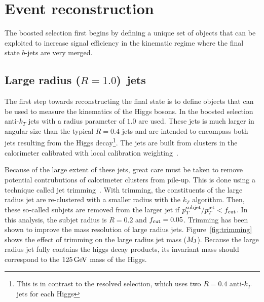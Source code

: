 \section{Event reconstruction}

The boosted selection first begins by defining a unique set of objects that can be exploited to increase signal efficiency in the kinematic regime where the final state $b$-jets are very merged. 

\subsection{Large radius ($R = 1.0$)\, jets}

The first step towards reconstructing the final state is to define objects that can be used to measure the kinematics of the Higgs bosons. In the boosted selection anti-$k_{T}$ jets with a radius parameter of $1.0$ are used. These jets is much larger in angular size than the typical $R=0.4$ jets and are intended to encompass both jets resulting from the Higgs decay\footnote{This is in contrast to the resolved selection, which uses two $R=0.4$ anti-$k_{T}$ jets for each Higgs}. The jets are built from clusters in the calorimeter calibrated with local calibration weighting~\cite{JetCalib}. 

Because of the large extent of these jets, great care must be taken to remove potential contrubutions of calorimeter clusters from pile-up. This is done using a technique called jet trimming~\cite{Trimming}. With trimming, the constituents of the large radius jet are re-clustered with a smaller radius with the $k_{T}$ algorithm. Then, these so-called subjets are removed from the larger jet if $p_{T}^{\rm subjet}/p_{T}^{\rm jet} < f_{\rm cut}$. In this analysis, the subjet radius is $R = 0.2$ and $f_{\rm cut} = 0.05$. Trimming has been shown to improve the mass resolution of large radius jets. Figure~\ref{fig:trimming} shows the effect of trimming on the large radius jet mass ($M_{\rm J}$). Because the large radius jet fully contains the higgs decay products, its invariant mass should correspond to the $125 \GeV$ mass of the Higgs. 

